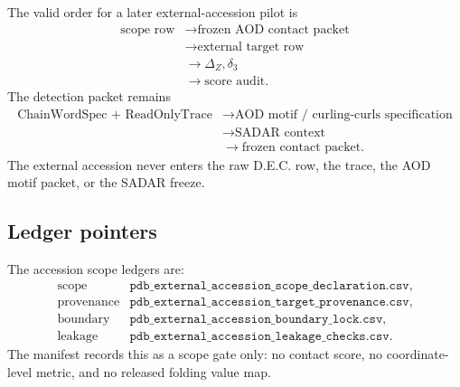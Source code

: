 The valid order for a later external-accession pilot is
\[
\begin{aligned}
\text{scope row}
&\rightarrow \text{frozen AOD contact packet}\\
&\rightarrow \text{external target row}\\
&\rightarrow \Delta_Z,\delta_3\\
&\rightarrow \text{score audit}.
\end{aligned}
\]
The detection packet remains
\[
\begin{aligned}
\text{ChainWordSpec + ReadOnlyTrace}
&\rightarrow \text{AOD motif / curling-curls specification}\\
&\rightarrow \text{SADAR context}\\
&\rightarrow \text{frozen contact packet}.
\end{aligned}
\]
The external accession never enters the raw D.E.C. row, the trace, the AOD motif packet, or the SADAR freeze.

\subsection{Ledger pointers}

The accession scope ledgers are:
\[
\begin{array}{ll}
\text{scope} & \texttt{pdb\_external\_accession\_scope\_declaration.csv},\\
\text{provenance} & \texttt{pdb\_external\_accession\_target\_provenance.csv},\\
\text{boundary} & \texttt{pdb\_external\_accession\_boundary\_lock.csv},\\
\text{leakage} & \texttt{pdb\_external\_accession\_leakage\_checks.csv}.
\end{array}
\]
The manifest records this as a scope gate only: no contact score, no coordinate-level metric, and no released folding value map.
